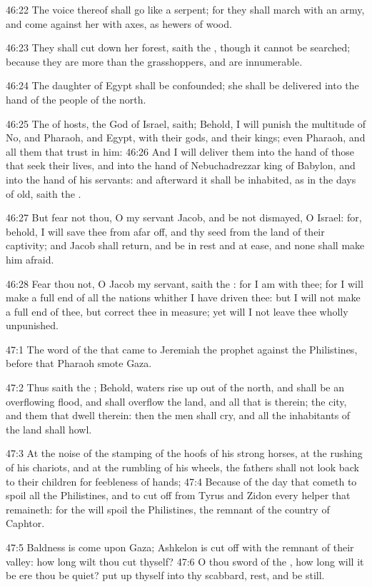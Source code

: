 46:22 The voice thereof shall go like a serpent; for they shall march
with an army, and come against her with axes, as hewers of wood.

46:23 They shall cut down her forest, saith the \LORD, though it cannot
be searched; because they are more than the grasshoppers, and are
innumerable.

46:24 The daughter of Egypt shall be confounded; she shall be
delivered into the hand of the people of the north.

46:25 The \LORD of hosts, the God of Israel, saith; Behold, I will
punish the multitude of No, and Pharaoh, and Egypt, with their gods,
and their kings; even Pharaoh, and all them that trust in him: 46:26
And I will deliver them into the hand of those that seek their lives,
and into the hand of Nebuchadrezzar king of Babylon, and into the hand
of his servants: and afterward it shall be inhabited, as in the days
of old, saith the \LORD.

46:27 But fear not thou, O my servant Jacob, and be not dismayed, O
Israel: for, behold, I will save thee from afar off, and thy seed from
the land of their captivity; and Jacob shall return, and be in rest
and at ease, and none shall make him afraid.

46:28 Fear thou not, O Jacob my servant, saith the \LORD: for I am with
thee; for I will make a full end of all the nations whither I have
driven thee: but I will not make a full end of thee, but correct thee
in measure; yet will I not leave thee wholly unpunished.

47:1 The word of the \LORD that came to Jeremiah the prophet against
the Philistines, before that Pharaoh smote Gaza.

47:2 Thus saith the \LORD; Behold, waters rise up out of the north, and
shall be an overflowing flood, and shall overflow the land, and all
that is therein; the city, and them that dwell therein: then the men
shall cry, and all the inhabitants of the land shall howl.

47:3 At the noise of the stamping of the hoofs of his strong horses,
at the rushing of his chariots, and at the rumbling of his wheels, the
fathers shall not look back to their children for feebleness of hands;
47:4 Because of the day that cometh to spoil all the Philistines, and
to cut off from Tyrus and Zidon every helper that remaineth: for the
\LORD will spoil the Philistines, the remnant of the country of
Caphtor.

47:5 Baldness is come upon Gaza; Ashkelon is cut off with the remnant
of their valley: how long wilt thou cut thyself?  47:6 O thou sword of
the \LORD, how long will it be ere thou be quiet? put up thyself into
thy scabbard, rest, and be still.

